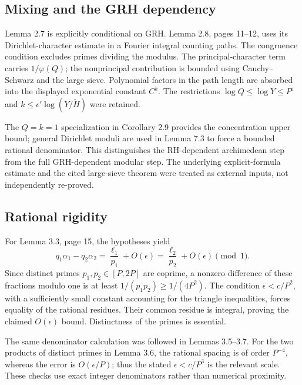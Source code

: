 \documentclass[10pt]{article}
\begin{document}
\subsection*{Mixing and the GRH dependency}
Lemma 2.7 is explicitly conditional on GRH. Lemma 2.8, pages 11–12, uses its Dirichlet-character estimate in a Fourier integral counting paths. The congruence condition excludes primes dividing the modulus. The principal-character term carries \(1/\varphi(Q)\); the nonprincipal contribution is bounded using Cauchy–Schwarz and the large sieve. Polynomial factors in the path length are absorbed into the displayed exponential constant \(C^k\). The restrictions \(\log Q\le\log Y\le P^\epsilon\) and \(k\le\epsilon'\log(Y/\widetilde H)\) were retained.\par
The \(Q=k=1\) specialization in Corollary 2.9 provides the concentration upper bound; general Dirichlet moduli are used in Lemma 7.3 to force a bounded rational denominator. This distinguishes the RH-dependent archimedean step from the full GRH-dependent modular step. The underlying explicit-formula estimate and the cited large-sieve theorem were treated as external inputs, not independently re-proved.\par
\subsection*{Rational rigidity}
For Lemma 3.3, page 15, the hypotheses yield \[q_1\alpha_1-q_2\alpha_2
   =\frac{\ell_1}{p_1}+O(\epsilon)
   =\frac{\ell_2}{p_2}+O(\epsilon)\pmod1 .\] Since distinct primes \(p_1,p_2\in[P,2P]\) are coprime, a nonzero difference of these fractions modulo one is at least \(1/(p_1p_2)\ge1/(4P^2)\). The condition \(\epsilon<c/P^2\), with a sufficiently small constant accounting for the triangle inequalities, forces equality of the rational residues. Their common residue is integral, proving the claimed \(O(\epsilon)\) bound. Distinctness of the primes is essential.\par
The same denominator calculation was followed in Lemmas 3.5–3.7. For the two products of distinct primes in Lemma 3.6, the rational spacing is of order \(P^{-4}\), whereas the error is \(O(\epsilon/P)\); thus the stated \(\epsilon<c/P^3\) is the relevant scale. These checks use exact integer denominators rather than numerical proximity.\par
\end{document}
